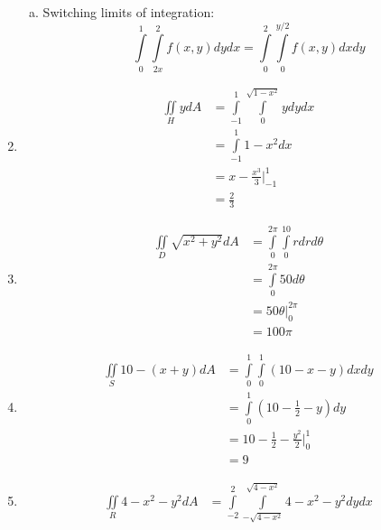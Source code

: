 \documentclass{article}
\begin{document}
\begin{enumerate}[1.]
\begin{enumerate}[a.]
      \item Switching limits of integration:
        $$ \int\limits_{0}^{1}\int\limits_{2x}^{2} f(x, y) dy dx =
        \int\limits_{0}^{2}\int\limits_{0}^{y/2} f(x, y) dx dy $$
    \end{enumerate}
  \item \begin{align*}
      \iint\limits_{H} y dA &= \int\limits_{-1}^{1}\int\limits_{0}^{\sqrt{1 -
      x^{2}}} y dy dx \\
      &= \int\limits_{-1}^{1} 1 - x^{2} dx \\
      &= x - \frac{ x^{3} }{ 3 } \bigg\vert_{-1}^{1} \\
      &= \frac{ 2 }{ 3 }
    \end{align*}
  \item \begin{align*}
      \iint\limits_{D} \sqrt{x^{2} + y^{2}} dA &=
      \int\limits_{0}^{2\pi}\int\limits_{0}^{10} r dr d\theta \\
      &= \int\limits_{0}^{2\pi} 50 d\theta \\
      &= 50 \theta \bigg\vert_{0}^{2\pi} \\
      &= 100 \pi
    \end{align*}
  \item \begin{align*}
      \iint\limits_{S} 10 - (x + y) dA &= \int\limits_{0}^{1}\int\limits_{0}^{1}
      (10 - x - y) dx dy \\
      &= \int\limits_{0}^{1} \left( 10 - \frac{ 1 }{ 2 } - y \right) dy \\
      &= 10 - \frac{ 1 }{ 2 } - \frac{ y^{2} }{ 2 } \bigg\vert_{0}^{1} \\
      &= 9
    \end{align*}
  \item \begin{align*}
      \iint\limits_{R} 4 - x^{2}-y^{2}dA &=
      \int\limits_{-2}^{2}\int\limits_{-\sqrt{4 - x^{2}}}^{\sqrt{4-x^{2}}}4 -
      x^{2} - y^{2} dy dx
    \end{align*}
\end{enumerate}
\end{document}
